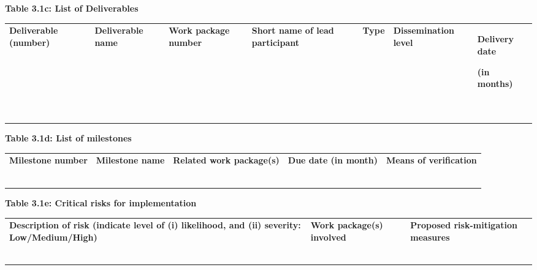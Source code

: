 \textbf{Table 3.1c: List of Deliverables }

\begin{longtable}[]{@{}
  >{\raggedright\arraybackslash}p{}
  >{\raggedright\arraybackslash}p{}
  >{\raggedright\arraybackslash}p{}
  >{\raggedright\arraybackslash}p{}
  >{\raggedright\arraybackslash}p{}
  >{\raggedright\arraybackslash}p{}
  >{\raggedright\arraybackslash}p{}@{}}
\toprule
\endhead
\textbf{Deliverable (number)} & \textbf{Deliverable name} & \textbf{Work
package number } & \textbf{Short name of lead participant } &
\textbf{Type} & \textbf{Dissemination level} & \textbf{Delivery date}

\textbf{(in months)} \\
& & & & & & \\
& & & & & & \\
& & & & & & \\
& & & & & & \\
& & & & & & \\
& & & & & & \\
& & & & & & \\
\bottomrule
\end{longtable}

\textbf{Table 3.1d: List of milestones }

\begin{longtable}[]{@{}lllll@{}}
\toprule
\endhead
\textbf{Milestone number} & \textbf{Milestone name} & \textbf{Related
work package(s)} & \textbf{Due date (in month)} & \textbf{Means of
verification} \\
& & & & \\
& & & & \\
& & & & \\
& & & & \\
& & & & \\
& & & & \\
\bottomrule
\end{longtable}

\textbf{Table 3.1e: Critical risks for implementation }

\begin{longtable}[]{@{}lll@{}}
\toprule
\endhead
\textbf{Description of risk (indicate level of (i) likelihood, and (ii)
severity: Low/Medium/High)} & \textbf{Work package(s) involved} &
\textbf{Proposed risk-mitigation measures} \\
& & \\
& & \\
& & \\
& & \\
& & \\
& & \\
\bottomrule
\end{longtable}


